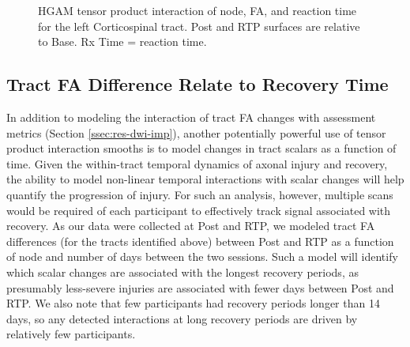 \documentclass[12pt]{article}
\begin{document}
\begin{figure}[H]
	\centering
	\caption{HGAM tensor product interaction of node, FA, and reaction time for the left Corticospinal tract. Post and RTP surfaces are relative to Base. Rx Time = reaction time.}
	\label{fig:lgio-intx-lcs}
\end{figure}


\subsection{Tract FA Difference Relate to Recovery Time}
\label{ssec:res-dwi-time}
In addition to modeling the interaction of tract FA changes with assessment metrics (Section \ref{ssec:res-dwi-imp}), another potentially powerful use of tensor product interaction smooths is to model changes in tract scalars as a function of time. Given the within-tract temporal dynamics of axonal injury and recovery, the ability to model non-linear temporal interactions with scalar changes will help quantify the progression of injury. For such an analysis, however, multiple scans would be required of each participant to effectively track signal associated with recovery. As our data were collected at Post and RTP, we modeled tract FA differences (for the tracts identified above) between Post and RTP as a function of node and number of days between the two sessions. Such a model will identify which scalar changes are associated with the longest recovery periods, as presumably less-severe injuries are associated with fewer days between Post and RTP. We also note that few participants had recovery periods longer than 14 days, so any detected interactions at long recovery periods are driven by relatively few participants.
\end{document}
